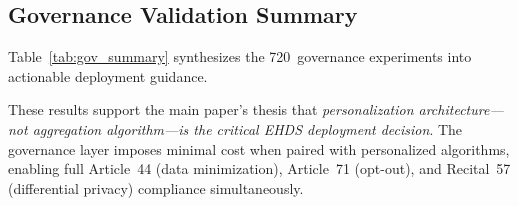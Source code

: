 \documentclass[conference]{IEEEtran}
\begin{document}
\subsection{Governance Validation Summary}
\label{sec:governance_summary}

Table~\ref{tab:gov_summary} synthesizes the 720~governance experiments into actionable deployment guidance.

\begin{table}[htbp]
\centering
\caption{Governance Validation: Summary of 720 Experiments}
\label{tab:gov_summary}
\end{table}

\noindent These results support the main paper's thesis that \textit{personalization architecture---not aggregation algorithm---is the critical EHDS deployment decision}. The governance layer imposes minimal cost when paired with personalized algorithms, enabling full Article~44 (data minimization), Article~71 (opt-out), and Recital~57 (differential privacy) compliance simultaneously.
\end{document}
